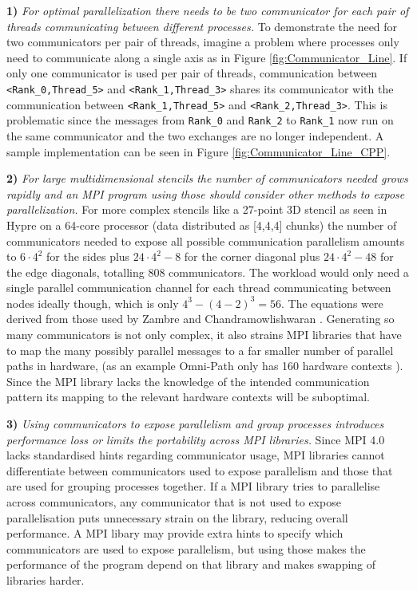 \documentclass[sigconf]{acmart}
\begin{document}
\textbf{1)} \textit{For optimal parallelization there needs to be two communicator for each pair of threads communicating between different processes.}
To demonstrate the need for two communicators per pair of threads, imagine a problem where processes only need to communicate along a single axis as in Figure \ref{fig:Communicator_Line}.
If only one communicator is used per pair of threads, communication between \verb|<Rank_0,Thread_5>| and \verb|<Rank_1,Thread_3>| shares its communicator with the communication between \verb|<Rank_1,Thread_5>| and \verb|<Rank_2,Thread_3>|.
This is problematic since the messages from \verb|Rank_0| and \verb|Rank_2| to \verb|Rank_1| now run on the same communicator and the two exchanges are no longer independent.
A sample implementation can be seen in Figure \ref{fig:Communicator_Line_CPP}.

\textbf{2)} \textit{For large multidimensional stencils the number of communicators needed grows rapidly and an MPI program using those should consider other methods to expose parallelization.}
For more complex stencils like a 27-point 3D stencil as seen in Hypre\cite{hypre2020} on a 64-core processor (data distributed as [4,4,4] chunks) the number of communicators needed to expose all possible communication parallelism amounts to $6 \cdot 4^2$ for the sides plus $24 \cdot 4^2 - 8$ for the corner diagonal plus $24 \cdot 4^2 - 48$ for the edge diagonals, totalling $808$ communicators.
The workload would only need a single parallel communication channel for each thread communicating between nodes ideally though, which is only $4^3 - (4-2)^3 = 56$.
The equations were derived from those used by Zambre and Chandramowlishwaran \cite{zambreLessonsLearned2022}.
Generating so many communicators is not only complex, it also strains MPI libraries that have to map the many possibly parallel messages to a far smaller number of parallel paths in hardware, (as an example Omni-Path only has 160 hardware contexts \cite{intelOmniPath}).
Since the MPI library lacks the knowledge of the intended communication pattern its mapping to the relevant hardware contexts will be suboptimal.

\textbf{3)} \textit{Using communicators to expose parallelism and group processes introduces performance loss or limits the portability across MPI libraries.}
Since MPI 4.0 lacks standardised hints regarding communicator usage, MPI libraries cannot differentiate between communicators used to expose parallelism and those that are used for grouping processes together.
If a MPI library tries to parallelise across communicators, any communicator that is not used to expose parallelisation puts unnecessary strain on the library, reducing overall performance.
A MPI libary may provide extra hints to specify which communicators are used to expose parallelism, but using those makes the performance of the program depend on that library and makes swapping of libraries harder.
\end{document}
